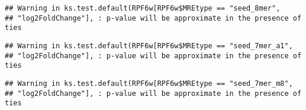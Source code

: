 \documentclass[
]{article}
\newenvironment{Shaded}{\begin{snugshade}}{\end{snugshade}}
\newcommand{\FunctionTok}[1]{\textcolor[rgb]{0.13,0.29,0.53}{\textbf{#1}}}
\newcommand{\NormalTok}[1]{#1}
\newcommand{\OtherTok}[1]{\textcolor[rgb]{0.56,0.35,0.01}{#1}}
\newcommand{\SpecialCharTok}[1]{\textcolor[rgb]{0.81,0.36,0.00}{\textbf{#1}}}
\newcommand{\StringTok}[1]{\textcolor[rgb]{0.31,0.60,0.02}{#1}}
\begin{document}
\begin{verbatim}
## Warning in ks.test.default(RPF6w[RPF6w$MREtype == "seed_8mer",
## "log2FoldChange"], : p-value will be approximate in the presence of ties
\end{verbatim}

\begin{Shaded}
\end{Shaded}

\begin{verbatim}
## Warning in ks.test.default(RPF6w[RPF6w$MREtype == "seed_7mer_a1",
## "log2FoldChange"], : p-value will be approximate in the presence of ties
\end{verbatim}

\begin{Shaded}
\end{Shaded}

\begin{verbatim}
## Warning in ks.test.default(RPF6w[RPF6w$MREtype == "seed_7mer_m8",
## "log2FoldChange"], : p-value will be approximate in the presence of ties
\end{verbatim}

\begin{Shaded}
\end{Shaded}
\end{document}
